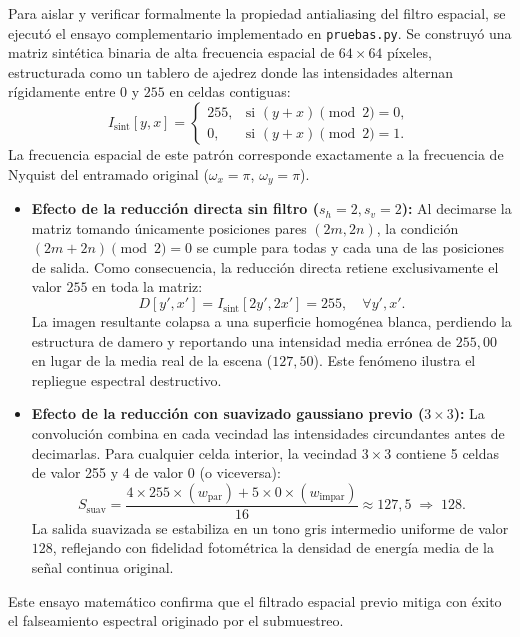 \documentclass[11pt]{article}
\begin{document}
Para aislar y verificar formalmente la propiedad antialiasing del filtro espacial, se ejecutó el ensayo complementario implementado en \texttt{pruebas.py}. Se construyó una matriz sintética binaria de alta frecuencia espacial de $64 \times 64$ píxeles, estructurada como un tablero de ajedrez donde las intensidades alternan rígidamente entre $0$ y $255$ en celdas contiguas:
\begin{equation}
I_{\text{sint}}[y, x] = \begin{cases} 255, & \text{si } (y + x) \pmod 2 = 0, \\ 0, & \text{si } (y + x) \pmod 2 = 1. \end{cases}
\end{equation}
La frecuencia espacial de este patrón corresponde exactamente a la frecuencia de Nyquist del entramado original ($\omega_x = \pi$, $\omega_y = \pi$).
\begin{itemize}[itemsep=0.2em]
\item \textbf{Efecto de la reducción directa sin filtro ($s_h=2, s_v=2$):}
Al decimarse la matriz tomando únicamente posiciones pares $(2m, 2n)$, la condición $(2m + 2n) \pmod 2 = 0$ se cumple para todas y cada una de las posiciones de salida. Como consecuencia, la reducción directa retiene exclusivamente el valor $255$ en toda la matriz:
\begin{equation}
D[y', x'] = I_{\text{sint}}[2y', 2x'] = 255, \quad \forall y', x'.
\end{equation}
La imagen resultante colapsa a una superficie homogénea blanca, perdiendo la estructura de damero y reportando una intensidad media errónea de $255,00$ en lugar de la media real de la escena ($127,50$). Este fenómeno ilustra el repliegue espectral destructivo.
\item \textbf{Efecto de la reducción con suavizado gaussiano previo ($3\times3$):}
La convolución combina en cada vecindad las intensidades circundantes antes de decimarlas. Para cualquier celda interior, la vecindad $3\times3$ contiene 5 celdas de valor 255 y 4 de valor 0 (o viceversa):
\begin{equation}
S_{\text{suav}} = \frac{4 \times 255 \times (w_{\text{par}}) + 5 \times 0 \times (w_{\text{impar}})}{16} \approx 127,5 \;\Rightarrow\; 128.
\end{equation}
La salida suavizada se estabiliza en un tono gris intermedio uniforme de valor $128$, reflejando con fidelidad fotométrica la densidad de energía media de la señal continua original.
\end{itemize}
Este ensayo matemático confirma que el filtrado espacial previo mitiga con éxito el falseamiento espectral originado por el submuestreo.
\end{document}

